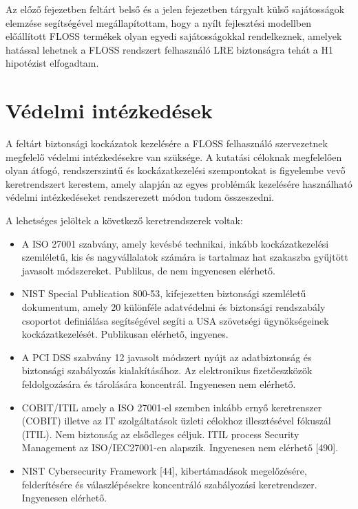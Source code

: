 \documentclass[12pt,magyar,a4paper,oneside]{scrreprt}
\providecommand{\tightlist}{%
  \setlength{\itemsep}{0pt}\setlength{\parskip}{0pt}}
\begin{document}
Az előző fejezetben feltárt belső és a jelen fejezetben tárgyalt külső
sajátosságok elemzése segítségével megállapítottam, hogy a nyílt
fejlesztési modellben előállított FLOSS termékek olyan egyedi
sajátosságokkal rendelkeznek, amelyek hatással lehetnek a FLOSS
rendszert felhasználó LRE biztonságra tehát a H1 hipotézist elfogadtam.

\hypertarget{sec:ELLENINT}{%
\chapter{Védelmi intézkedések}\label{sec:ELLENINT}}

A feltárt biztonsági kockázatok kezelésére a FLOSS felhasználó
szervezetnek megfelelő védelmi intézkedésekre van szüksége. A kutatási
céloknak megfelelően olyan átfogó, rendszerszintű és kockázatkezelési
szempontokat is figyelembe vevő keretrendszert kerestem, amely alapján
az egyes problémák kezelésére használható védelmi intézkedéseket
rendszerezett módon tudom összeszedni.

A lehetséges jelöltek a következő keretrendszerek voltak:

\begin{itemize}
\tightlist
\item
  A ISO 27001 szabvány, amely kevésbé technikai, inkább kockázatkezelési
  szemléletű, kis és nagyvállalatok számára is tartalmaz hat szakaszba
  gyűjtött javasolt módszereket. Publikus, de nem ingyenesen elérhető.
\item
  NIST Special Publication 800-53, kifejezetten biztonsági szemléletű
  dokumentum, amely 20 különféle adatvédelmi és biztonsági rendszabály
  csoportot definiálása segítségével segíti a USA szövetségi
  ügynökségeinek kockázatkezelését. Publikusan elérhető, ingyenes.
\item
  A PCI DSS szabvány 12 javasolt módszert nyújt az adatbiztonság és
  biztonsági szabályozás kialakításához. Az elektronikus fizetőeszközök
  feldolgozására és tárolására koncentrál. Ingyenesen nem elérhető.
\item
  COBIT/ITIL amely a ISO 27001-el szemben inkább ernyő keretrenszer
  (COBIT) illetve az IT szolgáltatások üzleti célokhoz illesztésével
  fókuszál (ITIL). Nem biztonság az elsődleges céljuk. ITIL process
  Security Management az ISO/IEC27001-en alapszik. Ingyenesen nem
  elérhető {[}490{]}.
\item
  NIST Cybersecurity Framework {[}44{]}, kibertámadások megelőzésére,
  felderítésére és válaszlépésekre koncentráló szabályozási
  keretrendszer. Ingyenesen elérhető.
\end{itemize}
\end{document}
